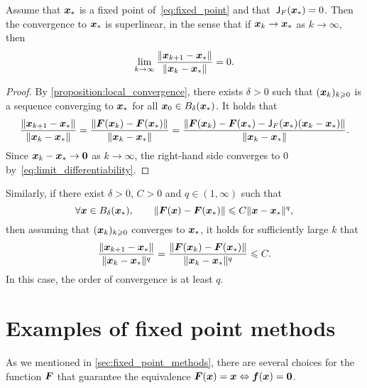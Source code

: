 \begin{proposition}
    \label{proposition:superlinear_convergence}
    Assume that $\mathbf{\boldsymbol{x}}_*$ is a fixed point of~\eqref{eq:fixed_point} and that~$\mathsf J_F(\mathbf{\boldsymbol{x}}_*) = 0$.
    Then the convergence to $\mathbf{\boldsymbol{x}}_*$ is superlinear,
    in the sense that if $\mathbf{\boldsymbol{x}}_k \to \mathbf{\boldsymbol{x}}_*$ as $k \to \infty$,
    then
    \[
        \lim_{k \to \infty} \frac{\lVert\mathbf{\boldsymbol{x}}_{k+1} - \mathbf{\boldsymbol{x}}_*\rVert}{\lVert\mathbf{\boldsymbol{x}}_k - \mathbf{\boldsymbol{x}}_*\rVert} = 0.
    \]
\end{proposition}
\begin{proof}
    By \cref{proposition:local_convergence},
    there exists $\delta > 0$ such that $(\mathbf{\boldsymbol{x}}_k)_{k\geqslant 0}$ is a sequence converging to $\mathbf{\boldsymbol{x}}_*$ for all $\mathbf{\boldsymbol{x}}_0 \in B_{\delta}(\mathbf{\boldsymbol{x}}_*)$.
    It holds that
    \[
        \frac{\lVert\mathbf{\boldsymbol{x}}_{k+1} - \mathbf{\boldsymbol{x}}_*\rVert}{\lVert\mathbf{\boldsymbol{x}}_k - \mathbf{\boldsymbol{x}}_*\rVert}
        = \frac{\lVert\mathbf{\boldsymbol{F}}(\mathbf{\boldsymbol{x}}_{k}) - \mathbf{\boldsymbol{F}}(\mathbf{\boldsymbol{x}}_*)\rVert}{\lVert\mathbf{\boldsymbol{x}}_k - \mathbf{\boldsymbol{x}}_*\rVert}
        =  \frac{\lVert\mathbf{\boldsymbol{F}}(\mathbf{\boldsymbol{x}}_{k}) - \mathbf{\boldsymbol{F}}(\mathbf{\boldsymbol{x}}_*) - \mathsf J_F(\mathbf{\boldsymbol{x}}_*) (\mathbf{\boldsymbol{x}}_k - \mathbf{\boldsymbol{x}}_*)\rVert}{\lVert\mathbf{\boldsymbol{x}}_k - \mathbf{\boldsymbol{x}}_*\rVert}.
    \]
    Since $\mathbf{\boldsymbol{x}}_k - \mathbf{\boldsymbol{x}}_* \to \mathbf{\boldsymbol{0}}$ as $k \to \infty$,
    the right-hand side converges to 0 by~\eqref{eq:limit_differentiability}.
\end{proof}

Similarly, if there exist $\delta > 0$, $C > 0$ and $q \in (1, \infty)$ such that
\begin{equation}
    \label{eq:condition_quadratic_convergence}
    \forall \vect x \in B_{\delta}(\vect x_*), \qquad
    \norm{\vect F(\vect x) - \vect F(\vect x_*)} \leq C \norm{\vect x - \vect x_*}^q,
\end{equation}
then assuming that $(\mathbf{\boldsymbol{x}}_k)_{k\geqslant0}$ converges to $\mathbf{\boldsymbol{x}}_*$,
it holds for sufficiently large $k$ that
\[
    \frac{\lVert\mathbf{\boldsymbol{x}}_{k+1} - \mathbf{\boldsymbol{x}}_*\rVert}{\lVert\mathbf{\boldsymbol{x}}_k - \mathbf{\boldsymbol{x}}_*\rVert^q}
    = \frac{\lVert\mathbf{\boldsymbol{F}}(\mathbf{\boldsymbol{x}}_{k}) - \mathbf{\boldsymbol{F}}(\mathbf{\boldsymbol{x}}_*)\rVert}{\lVert\mathbf{\boldsymbol{x}}_k - \mathbf{\boldsymbol{x}}_*\rVert^q}
    \leqslant C.
\]
In this case, the order of convergence is at least $q$.

\section{Examples of fixed point methods}
\label{sec:examples_of_fixed_point_methods}
As we mentioned in \cref{sec:fixed_point_methods},
there are several choices for the function $\mathbf{\boldsymbol{F}}$ that guarantee
the equivalence $\mathbf{\boldsymbol{F}}(\mathbf{\boldsymbol{x}}) = \mathbf{\boldsymbol{x}} \Leftrightarrow \mathbf{\boldsymbol{f}}(\mathbf{\boldsymbol{x}}) = \mathbf{\boldsymbol{0}}$.

